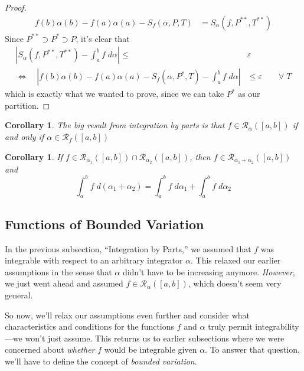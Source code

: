 \documentclass[12pt]{article}
\theoremstyle{plain}
\newtheorem{cor}[thm]{Corollary}
\theoremstyle{definition}
\theoremstyle{remark}
\begin{document}
\begin{proof}
\begin{align*}
    f(b) \alpha(b) - f(a)\alpha(a) - S_f(\alpha,P,T)
    &= S_\alpha(f, P^{**}, T^{**})
\end{align*}
Since $P^{**}\supset P^* \supset P$, it's clear that 
\begin{align*}
    \left\lvert S_\alpha(f,P^{**},T^{**}) - \int^b_a f\;d\alpha
    \right\rvert \leq &\varepsilon  \\
    \Leftrightarrow \quad 
        \left\lvert f(b) \alpha(b) - f(a)\alpha(a) 
        - S_f(\alpha,P^*,T) - 
        \int^b_a f \; d\alpha \right\rvert &\leq 
        \varepsilon \qquad \forall \; T
\end{align*}
which is exactly what we wanted to prove, since we can take $P^*$ as our partition. 
\end{proof}

\begin{cor}
The big result from integration by parts is that 
$f\in\mathscr{R}_\alpha([a,b])$ if and only if $\alpha\in\mathscr{R}_f([a,b])$
\end{cor}

\begin{cor}
If $f\in\mathscr{R}_{\alpha_1}([a,b]) \cap \mathscr{R}_{\alpha_2}([a,b])$, then $f\in\mathscr{R}_{\alpha_1 + \alpha_2}([a,b])$ and 
    \[ \int^b_a f\;d(\alpha_1 + \alpha_2) = 
    \int^b_a f\;d\alpha_1 + \int^b_a f\;d\alpha_2 \]
\end{cor}

\newpage
\subsection{Functions of Bounded Variation}

In the previous subsection, ``Integration by Parts,'' we assumed that $f$ was integrable with respect to an arbitrary integrator $\alpha$. This relaxed our earlier assumptions in the sense that $\alpha$ didn't have to be increasing anymore.  \emph{However}, we just went ahead and assumed $f\in\mathscr{R}_\alpha([a,b])$, which doesn't seem very general.

So now, we'll relax our assumptions even further and consider what characteristics and conditions for the functions $f$ and $\alpha$ truly permit integrability---we won't just assume.  This returns us to earlier subsections where we were concerned about \emph{whether} $f$ would be integrable given $\alpha$.  To answer that question, we'll have to define the concept of \emph{bounded variation}.
\end{document}
